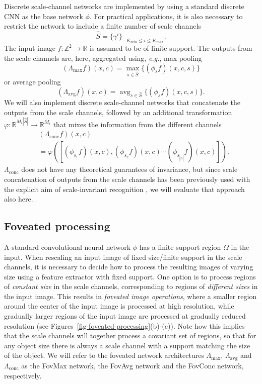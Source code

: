 \documentclass[twocolumn,runningheads]{svjour3}
\def\bbbr{{\mathbb R}}
\def\bbbz{{\mathbb Z}}
\newcommand{\avg}{\operatorname{avg}}
\newcommand{\conc}{\operatorname{conc}}
\begin{document}
Discrete scale-channel networks are implemented by using a standard
discrete CNN as the base network $\phi$. For practical applications,
it is also necessary to restrict the network to include a finite
number of scale channels 
\begin{equation}
   \hat{S} = \{ \gamma^{i}\}_{-K_{min} \leq i   \leq K_{max} }. 
\end{equation}
The input image $f:\bbbz^2 \to \bbbr$ is assumed to
be of finite support. 
The outputs from the scale channels are, here,  
aggregated using, {\em e.g.\/}, max pooling
\begin{equation}
(\Lambda_{\max}f)(x,c) = \max_{s \in \hat{S}} \{(\phi_s f)(x,c,s) \} 
\label{eq-lambda-s-max}
\end{equation}
or average pooling
\begin{equation}
(\Lambda_{\avg} f)(x,c)= \mathop{\avg}_{s \in \hat{S}} \{(\phi_s f)(x,c,s) \}.
\label{eq-lambda-s-avg}
\end{equation}
We will also implement discrete scale-channel networks that
concatenate the outputs from the scale channels, followed by an
additional transformation $\varphi: \bbbr^{M_i |\hat{S}|} \to
\bbbr^{M_i}$ that mixes the information from the different channels
\begin{align} 
&(\Lambda_{\conc} f)(x, c) \nonumber \\
&=  \varphi \left( [(\phi_{s_1} f)(x,c), (\phi_{s_2} f)(x,c) \cdots  (\phi_{s_{|\hat{S}|}} f)(x,c) ] \right).
\label{eq-lambda-s-conc}
\end{align}
$\Lambda_{\conc}$ does not have any theoretical guarantees of invariance, but 
since scale concatenation of outputs from the scale channels has been
previously used with the explicit aim of scale-invariant recognition
\cite{XuXiaZhaYanZha14-arXiv}, we will evaluate that approach also here.

\subsection{Foveated processing}
\label{sec-foveated-operations}

A standard convolutional neural network $\phi$ has a finite support region $\Omega$ in the input. 
When rescaling an input image of fixed size/finite support in the
scale channels, it is necessary to decide how to process the resulting
images of varying size using a feature extractor with fixed
support. One option is to process regions of {\em constant size\/} in
the scale channels, corresponding to regions of {\em different sizes\/}
in the input image.
This results in {\em foveated image operations\/}, where a smaller
region around the center of the input image is processed at high
resolution, while gradually larger regions of the input image are
processed at gradually reduced resolution (see
Figures~\ref{fig-foveated-processing}(b)-(c)). Note how this implies that the scale channels will together process a covariant set of regions, so that for any object size there is always a scale channel with a support matching the size of the object.
We will refer to the foveated network architectures $\Lambda_{\max} $,
$\Lambda_{\avg} $ and $\Lambda_{\conc} $ as the FovMax network, the
FovAvg network and the FovConc network, respectively.
\end{document}
